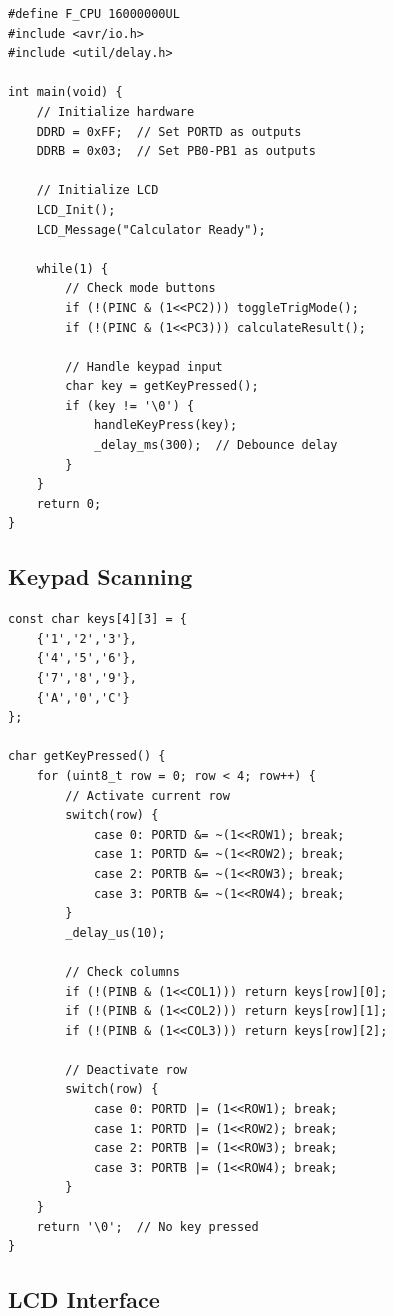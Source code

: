\documentclass{article}
\begin{document}
\begin{lstlisting}[caption=Main Program Loop, label=lst:main]
#define F_CPU 16000000UL
#include <avr/io.h>
#include <util/delay.h>

int main(void) {
    // Initialize hardware
    DDRD = 0xFF;  // Set PORTD as outputs
    DDRB = 0x03;  // Set PB0-PB1 as outputs
    
    // Initialize LCD
    LCD_Init();
    LCD_Message("Calculator Ready");
    
    while(1) {
        // Check mode buttons
        if (!(PINC & (1<<PC2))) toggleTrigMode();
        if (!(PINC & (1<<PC3))) calculateResult();
        
        // Handle keypad input
        char key = getKeyPressed();
        if (key != '\0') {
            handleKeyPress(key);
            _delay_ms(300);  // Debounce delay
        }
    }
    return 0;
}
\end{lstlisting}

\subsection{Keypad Scanning}

\begin{lstlisting}[caption=Keypad Scanning Function, label=lst:keypad]
const char keys[4][3] = {
    {'1','2','3'},
    {'4','5','6'},
    {'7','8','9'},
    {'A','0','C'}
};

char getKeyPressed() {
    for (uint8_t row = 0; row < 4; row++) {
        // Activate current row
        switch(row) {
            case 0: PORTD &= ~(1<<ROW1); break;
            case 1: PORTD &= ~(1<<ROW2); break;
            case 2: PORTB &= ~(1<<ROW3); break;
            case 3: PORTB &= ~(1<<ROW4); break;
        }
        _delay_us(10);
        
        // Check columns
        if (!(PINB & (1<<COL1))) return keys[row][0];
        if (!(PINB & (1<<COL2))) return keys[row][1];
        if (!(PINB & (1<<COL3))) return keys[row][2];
        
        // Deactivate row
        switch(row) {
            case 0: PORTD |= (1<<ROW1); break;
            case 1: PORTD |= (1<<ROW2); break;
            case 2: PORTB |= (1<<ROW3); break;
            case 3: PORTB |= (1<<ROW4); break;
        }
    }
    return '\0';  // No key pressed
}
\end{lstlisting}

\subsection{LCD Interface}
\end{document}
